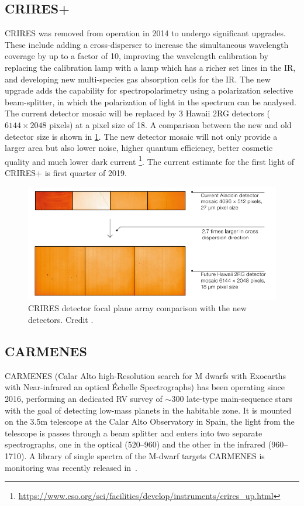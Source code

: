 \subsection{CRIRES+}
\label{subsec:criresplus}
CRIRES was removed from operation in 2014 to undergo significant upgrades\citep{dorn_crires_2014}.
These include adding a cross-disperser to increase the simultaneous wavelength coverage by up to a factor of 10, improving the wavelength calibration by replacing the \thar{} calibration lamp with a \une{} lamp which has a richer set lines in the IR, and developing new multi-species gas absorption cells for the IR.
The new upgrade adds the capability for spectropolarimetry using a polarization selective beam-splitter, in which the polarization of light in the spectrum can be analysed.
The current detector mosaic will be replaced by 3 Hawaii 2RG detectors (\(6144\times 2048\) pixels) at a pixel size of 18\um{}.
A comparison between the new and old detector size is shown in \cref{fig:criresplus_detecotrs}.
The new detector mosaic will not only provide a larger area but also lower noise, higher quantum efficiency, better cosmetic quality and much lower dark current
\footnote{\href{https://www.eso.org/sci/facilities/develop/instruments/crires_up.html}{https://www.eso.org/sci/facilities/develop/instruments/crires\_up.html}}.
The current estimate for the first light of CRIRES+ is first quarter of 2019.

\begin{figure}
    \centering
    \includegraphics[width=0.5\linewidth]{figures/spectroscopy/criresplus_detectors.pdf}
    \caption{CRIRES detector focal plane array comparison with the new detectors.
    Credit \citep{dorn_crires_2014}.}
    \label{fig:criresplus_detecotrs}
\end{figure}

\subsection{CARMENES}
\label{subsec:carmenes}
{CARMENES} (Calar Alto high-Resolution search for M dwarfs with Exoearths with Near-infrared an optical \'Echelle Spectrographs) has been operating since 2016, performing an dedicated RV survey of \(\sim300\) late-type main-sequence stars with the goal of detecting low-mass planets in the habitable zone.
It is mounted on the 3.5\si{\metre} telescope at the Calar Alto Observatory in Spain, the light from the telescope is passes through a beam splitter and enters into two separate spectrographs, one in the optical (520--960\nm) and the other in the infrared (960--1710\nm).
A library of single spectra of the {M-dwarf} targets CARMENES is monitoring was recently released in~\citep{reiners_carmenes_2018}.

